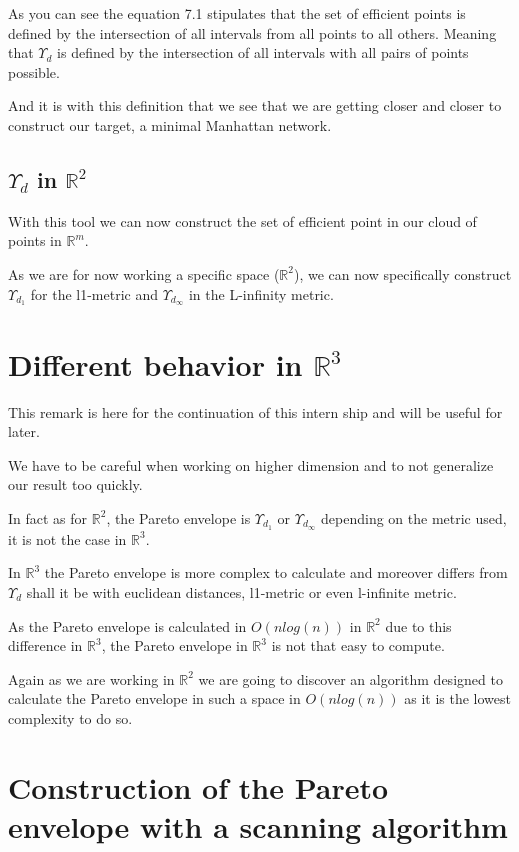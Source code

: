 As you can see the equation 7.1 stipulates that the set of efficient points is defined by the intersection of all intervals from all points to all others. Meaning that $\Upsilon_d$ is defined by the intersection of all intervals with all pairs of points possible.

And it is with this definition that we see that we are getting closer and closer to construct our target, a minimal Manhattan network.

\subsection{$\Upsilon_d$ in $\mathbb{R}^2$}%
With this tool we can now construct the set of efficient point in our cloud of points in $\mathbb{R}^m$.

As we are for now working a specific space ($\mathbb{R}^2$), we can now specifically construct $\Upsilon_{d_1}$ for the l1-metric and $\Upsilon_{d_{\infty}}$ in the L-infinity metric.

\section{Different behavior in $\mathbb{R}^3$}%
This remark is here for the continuation of this intern ship and will be useful for later. 

We have to be careful when working on higher dimension and to not generalize our result too quickly.

In fact as for $\mathbb{R}^2$, the Pareto envelope is $\Upsilon_{d_1}$ or $\Upsilon_{d_\infty}$ depending on the metric used, it is not the case in $\mathbb{R}^3$.

In $\mathbb{R}^3$ the Pareto envelope is more complex to calculate and moreover differs from $\Upsilon_d$ shall it be with euclidean distances, l1-metric or even l-infinite metric.

As the Pareto envelope is calculated in $O(n log(n))$ in $\mathbb{R}^2$ due to this difference in $\mathbb{R}^3$, the Pareto envelope in $\mathbb{R}^3$ is not that easy to compute.

Again as we are working in $\mathbb{R}^2$ we are going to discover an algorithm designed to calculate the Pareto envelope in such a space in $O(nlog(n))$ as it is the lowest complexity to do so.

\section{Construction of the Pareto envelope with a scanning algorithm}%
